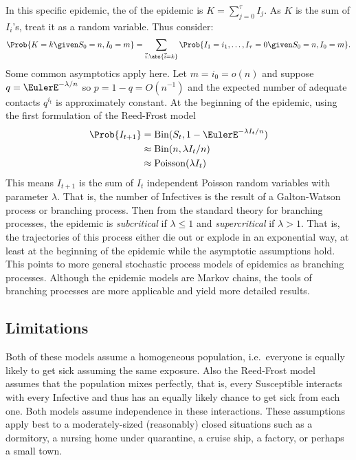 \documentclass[12pt]{article}
\begin{document}
In this specific epidemic, the %
of the epidemic is \( K=\sum_{j = 0}^{\tau} I_j \).  As \( K \) is the
sum of \( I_i \)'s, treat it as a random variable.  Thus consider:
\[
    \Prob{K=k \given S_0=n,I_0=m}=\sum_{\vec{i}:  \abs{\vec{i}=k}}\Prob {I_1
    =i_1,\ldots,I_{\tau}=0 \given S_0=n,I_0=m}.
\] Some common asymptotics apply here.  Let \( m = i_0 = o(n) \) and
suppose \( q = \EulerE^{-\lambda/n} \) so \( p = 1- q = O(n^{-1}) \) and
the expected number of adequate contacts \( q^{i_t} \) is approximately
constant.  At the beginning of the epidemic, using the first formulation
of the Reed-Frost model
\begin{align*}
    \Prob{I_{t+1}} &=
    \operatorname{Bin}
    (S_t, 1 - \EulerE^{-\lambda I_t/n}) \\
    &\approx
    \operatorname{Bin}
    (n, \lambda I_t/n) \\
    &\approx
    \operatorname{Poisson}
    (\lambda I_t)
\end{align*}
This means \( I_{t+1} \) is the sum of \( I_t \) independent Poisson
random variables with parameter \( \lambda \).  That is, the number of
Infectives is the result of a Galton-Watson process or branching
process.  Then from the standard theory for branching processes, the
epidemic is \emph{subcritical} if \( \lambda \le 1 \) and \emph{supercritical}
if \( \lambda > 1 \).  That is, the trajectories of this process either
die out or explode in an exponential way, at least at the beginning of
the epidemic while the asymptotic assumptions hold.  This points to more
general stochastic process models of epidemics as branching processes.
Although the epidemic models are Markov chains, the tools of branching
processes are more applicable and yield more detailed results.

\subsection*{Limitations}

Both of these models assume a homogeneous population, i.e.\ everyone is
equally likely to get sick assuming the same exposure.  Also the
Reed-Frost model assumes that the population mixes perfectly, that is,
every Susceptible interacts with every Infective and thus has an equally
likely chance to get sick from each one.  Both models assume
independence in these interactions.  These assumptions apply best to a
moderately-sized (reasonably) closed situations such as a dormitory, a
nursing home under quarantine, a cruise ship, a factory, or perhaps a
small town.
\end{document}
